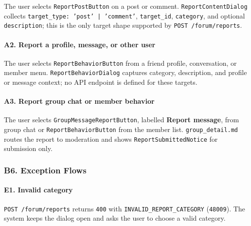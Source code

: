 \documentclass[12pt]{article}
\begin{document}
The user selects \texttt{ReportPostButton} on a post or comment. \texttt{ReportContentDialog} collects \texttt{target\_type: 'post' | 'comment'}, \texttt{target\_id}, \texttt{category}, and optional \texttt{description}; this is the only target shape supported by \texttt{POST /forum/reports}.
\par\medskip

\hypertarget{sec:a2-report-a-profile-message-or-other-user}{}
\paragraph*{A2. Report a profile, message, or other user}
\par\medskip

The user selects \texttt{ReportBehaviorButton} from a friend profile, conversation, or member menu. \texttt{ReportBehaviorDialog} captures category, description, and profile or message context; no API endpoint is defined for these targets.
\par\medskip

\hypertarget{sec:a3-report-group-chat-or-member-behavior}{}
\paragraph*{A3. Report group chat or member behavior}
\par\medskip

The user selects \texttt{GroupMessageReportButton}, labelled \textbf{Report message}, from group chat or \texttt{ReportBehaviorButton} from the member list. \texttt{group\_detail.md} routes the report to moderation and shows \texttt{ReportSubmittedNotice} for submission only.
\par\medskip

\hypertarget{sec:b6-exception-flows}{}
\subsubsection*{B6. Exception Flows}
\par\medskip

\hypertarget{sec:e1-invalid-category}{}
\paragraph*{E1. Invalid category}
\par\medskip

\texttt{POST /forum/reports} returns \texttt{400} with \texttt{INVALID\_REPORT\_CATEGORY} (\texttt{48009}). The system keeps the dialog open and asks the user to choose a valid category.
\par\medskip
\end{document}
